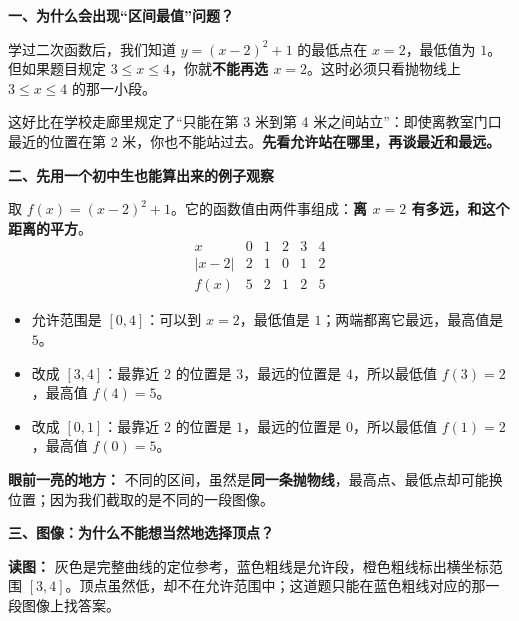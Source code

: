 \clearpage
\begin{explanationbox}
\textbf{\textcolor{CExplanation}{一、为什么会出现“区间最值”问题？}}



学过二次函数后，我们知道 $y=(x-2)^2+1$ 的最低点在 $x=2$，最低值为 $1$。但如果题目规定 $3\le x\le4$，你就\textbf{不能再选 $x=2$}。这时必须只看抛物线上 $3\le x\le4$ 的那一小段。

这好比在学校走廊里规定了“只能在第 3 米到第 4 米之间站立”：即使离教室门口最近的位置在第 2 米，你也不能站过去。\textbf{先看允许站在哪里，再谈最近和最远。}

\medskip

\end{explanationbox}
\clearpage
\begin{explanationbox}
\textbf{\textcolor{CExplanation}{二、先用一个初中生也能算出来的例子观察}}



取 $f(x)=(x-2)^2+1$。它的函数值由两件事组成：\textbf{离 $x=2$ 有多远，和这个距离的平方}。
\[
\begin{array}{c|ccccc}
x&0&1&2&3&4\\ \hline
|x-2|&2&1&0&1&2\\
f(x)&5&2&1&2&5
\end{array}
\]
\begin{itemize}[leftmargin=*,itemsep=0.3em]
\item 允许范围是 $[0,4]$：可以到 $x=2$，最低值是 $1$；两端都离它最远，最高值是 $5$。
\item 改成 $[3,4]$：最靠近 $2$ 的位置是 $3$，最远的位置是 $4$，所以最低值 $f(3)=2$，最高值 $f(4)=5$。
\item 改成 $[0,1]$：最靠近 $2$ 的位置是 $1$，最远的位置是 $0$，所以最低值 $f(1)=2$，最高值 $f(0)=5$。
\end{itemize}

\textbf{眼前一亮的地方：} 不同的区间，虽然是\textbf{同一条抛物线}，最高点、最低点却可能换位置；因为我们截取的是不同的一段图像。

\medskip

\end{explanationbox}
\clearpage
\begin{explanationbox}
\textbf{\textcolor{CExplanation}{三、图像：为什么不能想当然地选择顶点？}}




\textbf{读图：} 灰色是完整曲线的定位参考，蓝色粗线是允许段，橙色粗线标出横坐标范围 $[3,4]$。顶点虽然低，却不在允许范围中；这道题只能在蓝色粗线对应的那一段图像上找答案。

\medskip

\end{explanationbox}
